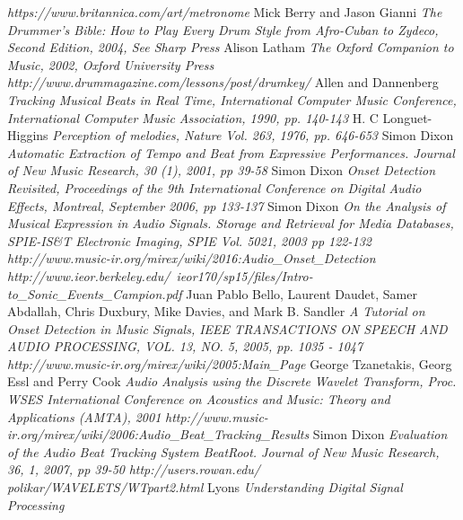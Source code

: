 \documentclass[a4paper, 11pt]{article}
\begin{document}
\newpage
\begin{thebibliography}{99}
\textit{https://www.britannica.com/art/metronome}
Mick Berry and Jason Gianni
\textit{The Drummer's Bible: How to Play Every Drum Style from Afro-Cuban to Zydeco, Second Edition, 2004, See Sharp Press}
Alison Latham
\textit{The Oxford Companion to Music, 2002, Oxford University Press}
\textit{http://www.drummagazine.com/lessons/post/drumkey/}
Allen and Dannenberg
\textit{Tracking Musical Beats in Real Time, International Computer Music Conference, International Computer Music Association, 1990, pp. 140-143}
H. C Longuet-Higgins
\textit{Perception of melodies, Nature Vol. 263, 1976, pp. 646-653}
Simon Dixon
\textit{Automatic Extraction of Tempo and Beat from Expressive Performances. Journal of New Music Research, 30 (1), 2001, pp 39-58}
Simon Dixon
\textit{Onset Detection Revisited, Proceedings of the 9th International Conference on Digital Audio Effects, Montreal, September 2006, pp 133-137}
Simon Dixon
\textit{On the Analysis of Musical Expression in Audio Signals. Storage and Retrieval for Media Databases, SPIE-IS\&T Electronic Imaging, SPIE Vol. 5021, 2003 pp 122-132}
\textit{http://www.music-ir.org/mirex/wiki/2016:Audio\_Onset\_Detection}
\textit{http://www.ieor.berkeley.edu/~ieor170/sp15/files/Intro-to\_Sonic\_Events\_Campion.pdf}
Juan Pablo Bello, Laurent Daudet, Samer Abdallah, Chris Duxbury, Mike Davies, and Mark B. Sandler 
\textit{A Tutorial on Onset Detection in Music Signals, IEEE TRANSACTIONS ON SPEECH AND AUDIO PROCESSING, VOL. 13, NO. 5, 2005, pp. 1035 - 1047}
\textit{http://www.music-ir.org/mirex/wiki/2005:Main\_Page}
George Tzanetakis, Georg Essl and Perry Cook
\textit{Audio Analysis using the Discrete Wavelet Transform, Proc. WSES International Conference on Acoustics and Music: Theory and Applications (AMTA), 2001}
\textit{http://www.music-ir.org/mirex/wiki/2006:Audio\_Beat\_Tracking\_Results}
Simon Dixon
\textit{Evaluation of the Audio Beat Tracking System BeatRoot. Journal of New Music Research, 36, 1, 2007, pp 39-50}
\textit{http://users.rowan.edu/ polikar/WAVELETS/WTpart2.html}
Lyons
\textit{Understanding Digital Signal Processing}
\end{thebibliography}
\end{document}
